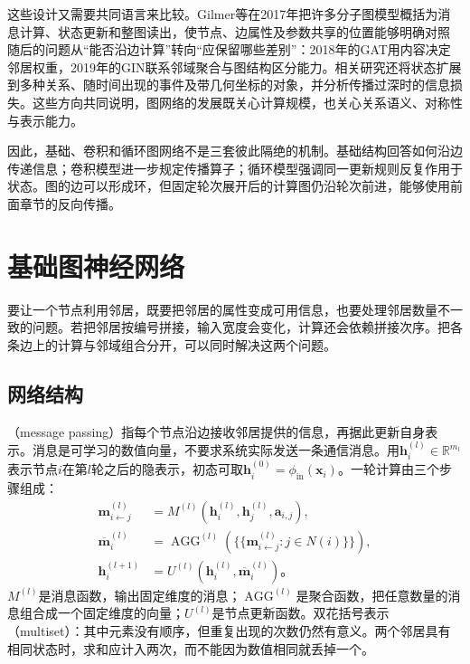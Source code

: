 这些设计又需要共同语言来比较。Gilmer等在2017年把许多分子图模型概括为消息计算、状态更新和整图读出，使节点、边属性及参数共享的位置能够明确对照 随后的问题从“能否沿边计算”转向“应保留哪些差别”：2018年的GAT用内容决定邻居权重，2019年的GIN联系邻域聚合与图结构区分能力。相关研究还将状态扩展到多种关系、随时间出现的事件及带几何坐标的对象，并分析传播过深时的信息损失。这些方向共同说明，图网络的发展既关心计算规模，也关心关系语义、对称性与表示能力。

因此，基础、卷积和循环图网络不是三套彼此隔绝的机制。基础结构回答如何沿边传递信息；卷积模型进一步规定传播算子；循环模型强调同一更新规则反复作用于状态。图的边可以形成环，但固定轮次展开后的计算图仍沿轮次前进，能够使用前面章节的反向传播。

\section{基础图神经网络}
\label{sec:gnn-basic}

要让一个节点利用邻居，既要把邻居的属性变成可用信息，也要处理邻居数量不一致的问题。若把邻居按编号拼接，输入宽度会变化，计算还会依赖拼接次序。把各条边上的计算与邻域组合分开，可以同时解决这两个问题。

\subsection{网络结构}
\label{sec:gnn-structure}

（message passing）指每个节点沿边接收邻居提供的信息，再据此更新自身表示。消息是可学习的数值向量，不要求系统实际发送一条通信消息。用$\bm{h}_i^{(l)}\in\mathbb{R}^{m_l}$表示节点$i$在第$l$轮之后的隐表示，初态可取$\bm{h}_i^{(0)}=\phi_{\mathrm{in}}(\bm{x}_i)$。一轮计算由三个步骤组成：
\begin{equation}
  \begin{aligned}
    \bm{m}_{i\leftarrow j}^{(l)}
      &=M^{(l)}\!\left(\bm{h}_i^{(l)},\bm{h}_j^{(l)},\bm{a}_{i,j}\right),\\
    \overline{\bm{m}}_i^{(l)}
      &=\operatorname{AGG}^{(l)}
        \!\left(\{\!\{\bm{m}_{i\leftarrow j}^{(l)}:j\in N(i)\}\!\}\right),\\
    \bm{h}_i^{(l+1)}
      &=U^{(l)}\!\left(\bm{h}_i^{(l)},\overline{\bm{m}}_i^{(l)}\right)\text{。}
  \end{aligned}
  \label{eq:gnn-message-passing}
\end{equation}
$M^{(l)}$是消息函数，输出固定维度的消息；$\operatorname{AGG}^{(l)}$是聚合函数，把任意数量的消息组合成一个固定维度的向量；$U^{(l)}$是节点更新函数。双花括号表示（multiset）：其中元素没有顺序，但重复出现的次数仍然有意义。两个邻居具有相同状态时，求和应计入两次，而不能因为数值相同就丢掉一个。

